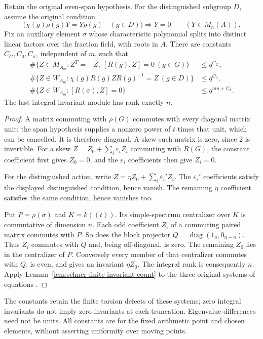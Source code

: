 \begin{proposition}
\label{prop:selmer-three-invariant-bounds}
Retain the original even-span hypothesis. For the distinguished
subgroup $D$, assume the original condition
\[
 \bigl(\chi(g)\rho(g)Y=Y\rho(g)\quad(g\in D)\bigr)
                    \Longrightarrow Y=0\qquad(Y\in M_n(A)).
\]
Fix an auxiliary element $\sigma$ whose characteristic polynomial
splits into distinct linear factors over the fraction field, with
roots in $A$. There are constants $C_G,C_0,C_\sigma$, independent
of $m$, such that
\[
\begin{aligned}
 \#\{Z\in M_{A_m}:Z^T=-Z,\ [R(g),Z]=0\ (g\in G)\}
      &\leq q^{C_G},\\
 \#\{Z\in W_{A_m}:\chi(g)R(g)ZR(g)^{-1}=Z\ (g\in D)\}
      &\leq q^{C_0},\\
 \#\{Z\in W_{A_m}:[R(\sigma),Z]=0\}
      &\leq q^{mn+C_\sigma}.
\end{aligned}
\]
The last integral invariant module has rank exactly $n$.
\end{proposition}
\begin{proof}
A matrix commuting with $\rho(G)$ commutes with every diagonal
matrix unit: the span hypothesis supplies a nonzero power of $t$
times that unit, which can be cancelled. It is therefore diagonal.
A skew such matrix is zero, since 2 is invertible. For a skew
$Z=Z_0+\sum_i\varepsilon_iZ_i$ commuting with $R(G)$, the constant
coefficient first gives $Z_0=0$, and the $\varepsilon_i$ coefficients
then give $Z_i=0$.

For the distinguished action, write
$Z=\eta Z_0+\sum_i\varepsilon_i'Z_i$. The
$\varepsilon_i'$ coefficients satisfy the displayed distinguished
condition, hence vanish. The remaining $\eta$ coefficient satisfies
the same condition, hence vanishes too.

Put $P=\rho(\sigma)$ and $K=k((t))$. Its simple-spectrum
centralizer over $K$ is commutative of dimension $n$. Each odd
coefficient $Z_i$ of a commuting paired matrix commutes with $P$.
So does the block projector $Q=\operatorname{diag}(1_a,0_{n-a})$.
Thus $Z_i$ commutes with $Q$ and, being off-diagonal, is zero.
The remaining $Z_0$ lies in the centralizer of $P$. Conversely
every member of that centralizer commutes with $Q$, is even, and
gives an invariant $\eta Z_0$. The integral rank is consequently
$n$. Apply Lemma~\ref{lem:selmer-finite-invariant-count} to the three
original systems of equations \cite{alpo-invariant-counts}.
\end{proof}

The constants retain the finite torsion defects of these systems;
zero integral invariants do not imply zero invariants at each
truncation. Eigenvalue differences need not be units. All constants
are for the fixed arithmetic point and chosen elements, without
asserting uniformity over moving points.
